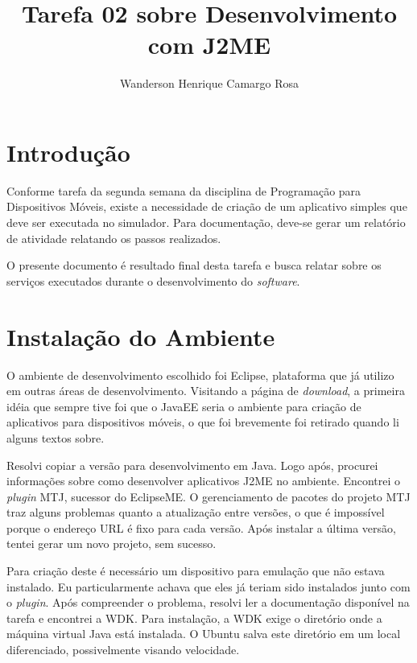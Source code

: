 \documentclass{article}
\title{Tarefa 02 sobre Desenvolvimento com J2ME}
\author{Wanderson Henrique Camargo Rosa\inst{1}}
\begin{document}
\maketitle{}

\section{Introdução}
\label{sec:introducao}

Conforme tarefa da segunda semana da disciplina de Programação para Dispositivos
Móveis, existe a necessidade de criação de um aplicativo simples que deve ser
executada no simulador. Para documentação, deve-se gerar um relatório de
atividade relatando os passos realizados.

O presente documento é resultado final desta tarefa e busca relatar sobre os
serviços executados durante o desenvolvimento do \emph{software}.

\section{Instalação do Ambiente}
\label{sec:instalacao}

O ambiente de desenvolvimento escolhido foi Eclipse, plataforma que já utilizo
em outras áreas de desenvolvimento. Visitando a página de \emph{download}, a
primeira idéia que sempre tive foi que o JavaEE seria o ambiente para criação de
aplicativos para dispositivos móveis, o que foi brevemente foi retirado quando
li alguns textos sobre.

Resolvi copiar a versão para desenvolvimento em Java. Logo após, procurei
informações sobre como desenvolver aplicativos J2ME no ambiente. Encontrei o
\emph{plugin} MTJ, sucessor do EclipseME. O gerenciamento de pacotes do projeto
MTJ traz alguns problemas quanto a atualização entre versões, o que é impossível
porque o endereço URL é fixo para cada versão. Após instalar a última versão,
tentei gerar um novo projeto, sem sucesso.

Para criação deste é necessário um dispositivo para emulação que não estava
instalado. Eu particularmente achava que eles já teriam sido instalados junto
com o \emph{plugin}. Após compreender o problema, resolvi ler a documentação
disponível na tarefa e encontrei a WDK. Para instalação, a WDK exige o diretório
onde a máquina virtual Java está instalada. O Ubuntu salva este diretório em um
local diferenciado, possivelmente visando velocidade.
\end{document}
